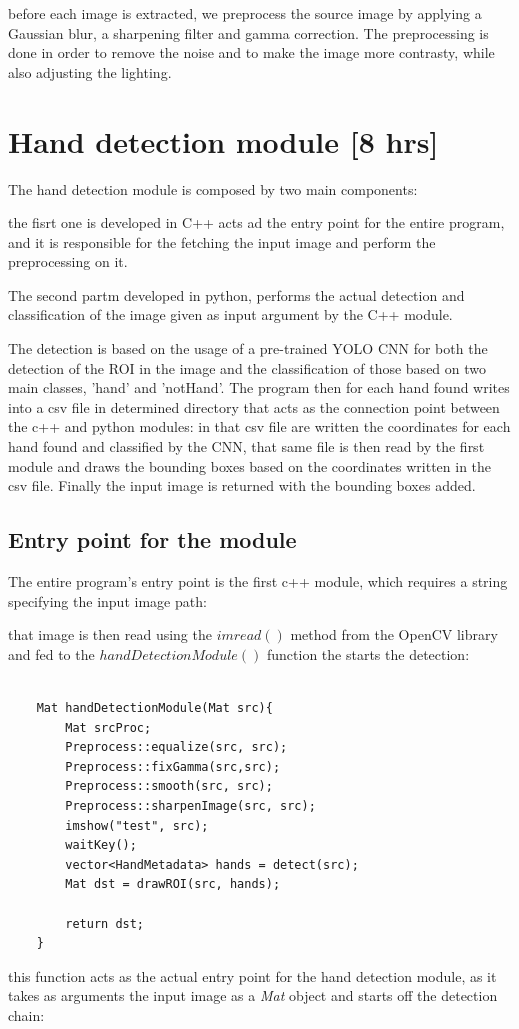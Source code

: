 before each image is extracted, we preprocess the source image by applying a Gaussian blur, a sharpening filter and gamma correction. The preprocessing is done in order to remove
the noise and to make the image more contrasty, while also adjusting the lighting.

\section{Hand detection module [8 hrs]}
The hand detection module is composed by two main components: 

the fisrt one is developed in C++ acts ad the entry point for the entire program, and it is responsible for the 
fetching the input image and perform the preprocessing on it.

The second partm developed in python, performs the actual detection and classification of the image given as input argument 
by the C++ module. 

The detection is based on the usage of a pre-trained YOLO CNN for both the detection of the ROI in the image and the classification 
of those based on two main classes, 'hand' and 'notHand'. The program then for each hand found writes into a csv file in determined 
directory that acts as the connection point between the c++ and python modules: in that csv file are written the coordinates for each hand found and classified
by the CNN, that same file is then read by the first module and draws the bounding boxes based on the coordinates written in the csv file. Finally the input image is 
returned with the bounding boxes added.

\subsection{Entry point for the module}

The entire program's entry point is the first c++ module, which requires a string specifying the input image path:

that image is then read using the $imread()$ method from the OpenCV library and fed to the $handDetectionModule()$ function the starts the detection: 

\begin{lstlisting}

    Mat handDetectionModule(Mat src){
        Mat srcProc;
        Preprocess::equalize(src, src);
        Preprocess::fixGamma(src,src);
        Preprocess::smooth(src, src);
        Preprocess::sharpenImage(src, src);
        imshow("test", src);
        waitKey();
        vector<HandMetadata> hands = detect(src);
        Mat dst = drawROI(src, hands);
    
        return dst;
    }

\end{lstlisting}
this function acts as the actual entry point for the hand detection module, as it takes as arguments the input image as a \textit{Mat} object and 
starts off the detection chain:

